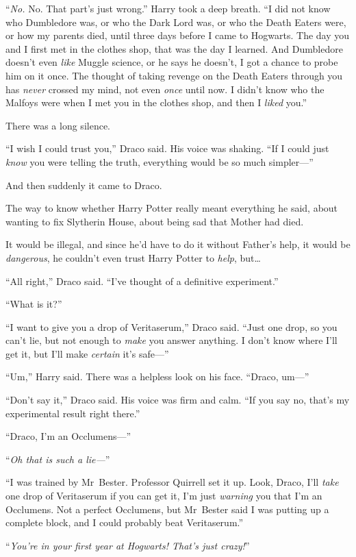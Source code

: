 “\emph{No.} No. That part’s just wrong.” Harry took a deep breath. “I did not know who Dumbledore was, or who the Dark Lord was, or who the Death Eaters were, or how my parents died, until three days before I came to Hogwarts. The day you and I first met in the clothes shop, that was the day I learned. And Dumbledore doesn’t even \emph{like} Muggle science, or he says he doesn’t, I got a chance to probe him on it once. The thought of taking revenge on the Death Eaters through you has \emph{never} crossed my mind, not even \emph{once} until now. I didn’t know who the Malfoys were when I met you in the clothes shop, and then I \emph{liked} you.”

There was a long silence.

“I wish I could trust you,” Draco said. His voice was shaking. “If I could just \emph{know} you were telling the truth, everything would be so much simpler—”

And then suddenly it came to Draco.

The way to know whether Harry Potter really meant everything he said, about wanting to fix Slytherin House, about being sad that Mother had died.

It would be illegal, and since he’d have to do it without Father’s help, it would be \emph{dangerous}, he couldn’t even trust Harry Potter to \emph{help}, but…

“All right,” Draco said. “I’ve thought of a definitive experiment.”

“What is it?”

“I want to give you a drop of Veritaserum,” Draco said. “Just one drop, so you can’t lie, but not enough to \emph{make} you answer anything. I don’t know where I’ll get it, but I’ll make \emph{certain} it’s safe—”

“Um,” Harry said. There was a helpless look on his face. “Draco, um—”

“Don’t say it,” Draco said. His voice was firm and calm. “If you say no, that’s my experimental result right there.”

“Draco, I’m an Occlumens—”

“\emph{Oh that is such a lie—}”

“I was trained by Mr~Bester. Professor Quirrell set it up. Look, Draco, I’ll \emph{take} one drop of Veritaserum if you can get it, I’m just \emph{warning} you that I’m an Occlumens. Not a perfect Occlumens, but Mr~Bester said I was putting up a complete block, and I could probably beat Veritaserum.”

“\emph{You’re in your first year at Hogwarts! That’s just crazy!}”

